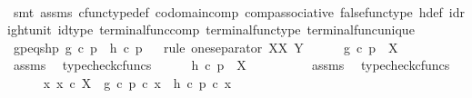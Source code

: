 \begin{isabellebody}
\ \ \ \ \isamarkupfalse%
\ {\isacharparenleft}{\kern0pt}smt\ assms{\isacharparenleft}{\kern0pt}{}{\isacharparenright}{\kern0pt}\ cfunc{\isacharunderscore}{\kern0pt}type{\isacharunderscore}{\kern0pt}def\ codomain{\isacharunderscore}{\kern0pt}comp\ comp{\isacharunderscore}{\kern0pt}associative\ false{\isacharunderscore}{\kern0pt}func{\isacharunderscore}{\kern0pt}type\ h{\isacharunderscore}{\kern0pt}def\ id{\isacharunderscore}{\kern0pt}right{\isacharunderscore}{\kern0pt}unit{}\ id{\isacharunderscore}{\kern0pt}type\ terminal{\isacharunderscore}{\kern0pt}func{\isacharunderscore}{\kern0pt}comp\ terminal{\isacharunderscore}{\kern0pt}func{\isacharunderscore}{\kern0pt}type\ terminal{\isacharunderscore}{\kern0pt}func{\isacharunderscore}{\kern0pt}unique{\isacharparenright}{\kern0pt}\isanewline
\ \ \isamarkupfalse%
\ gp{\isacharunderscore}{\kern0pt}eqs{\isacharunderscore}{\kern0pt}hp{\isacharcolon}{\kern0pt}\ {\isachardoublequoteopen}g\ {\isasymcirc}\isactrlsub c\ p\ {\isacharequal}{\kern0pt}\ h\ {\isasymcirc}\isactrlsub c\ p{\isachardoublequoteclose}\isanewline
\ \ \isamarkupfalse%
{\isacharparenleft}{\kern0pt}rule\ one{\isacharunderscore}{\kern0pt}separator{\isacharbrackleft}{\kern0pt}\ X{\isacharequal}{\kern0pt}X{\isacharcomma}{\kern0pt}\ Y{\isacharequal}{\kern0pt}{\isasymOmega}{\isacharbrackright}{\kern0pt}{\isacharparenright}{\kern0pt}\isanewline
\ \ \ \ \isamarkupfalse%
\ {\isachardoublequoteopen}g\ {\isasymcirc}\isactrlsub c\ p\ {\isacharcolon}{\kern0pt}\ X\ {\isasymrightarrow}\ {\isasymOmega}{\isachardoublequoteclose}\isanewline
\ \ \ \ \ \ \isamarkupfalse%
\ assms\ \isamarkupfalse%
\ typecheck{\isacharunderscore}{\kern0pt}cfuncs\isanewline
\ \ \ \ \isamarkupfalse%
\ {\isachardoublequoteopen}h\ {\isasymcirc}\isactrlsub c\ p\ {\isacharcolon}{\kern0pt}\ X\ {\isasymrightarrow}\ {\isasymOmega}{\isachardoublequoteclose}\isanewline
\ \ \ \ \ \ \isamarkupfalse%
\ assms\ \isamarkupfalse%
\ typecheck{\isacharunderscore}{\kern0pt}cfuncs\isanewline
\ \ \ \ \isamarkupfalse%
\ {\isachardoublequoteopen}{\isasymAnd}x{\isachardot}{\kern0pt}\ x\ {\isasymin}\isactrlsub c\ X\ {\isasymLongrightarrow}\ {\isacharparenleft}{\kern0pt}g\ {\isasymcirc}\isactrlsub c\ p{\isacharparenright}{\kern0pt}\ {\isasymcirc}\isactrlsub c\ x\ {\isacharequal}{\kern0pt}\ {\isacharparenleft}{\kern0pt}h\ {\isasymcirc}\isactrlsub c\ p{\isacharparenright}{\kern0pt}\ {\isasymcirc}\isactrlsub c\ x{\isachardoublequoteclose}\isanewline

\end{isabellebody}
